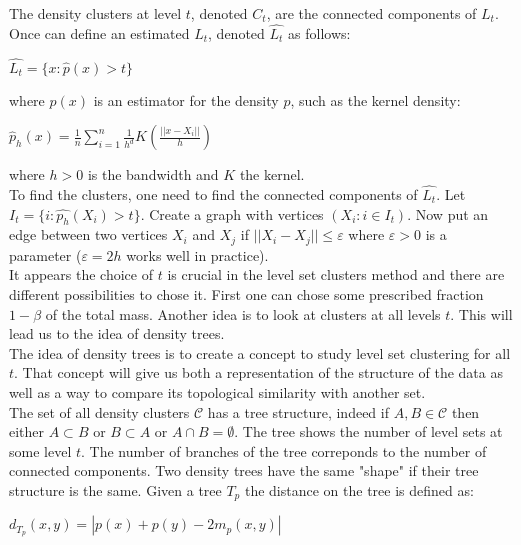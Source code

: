 \documentclass[12pt, a4paper]{article}
\begin{document}
  The density clusters at level $t$, denoted $C_t$, are the connected components of $L_t$. Once can define an estimated $L_t$, denoted $\hat{L_t}$ as follows:\\
  \begin{center}
    $\widehat{L_t} = \lbrace x : \widehat{p}(x) > t \rbrace $
  \end{center}

  where $\widehat{p}(x)$ is an estimator for the density $p$, such as the kernel density:

  \begin{center}
    $\widehat{p}_h(x) = \frac{1}{n} \sum\limits_{i=1}^n \frac{1}{h^d} K (\frac{||x-X_i||}{h})$
  \end{center}

  where $h > 0$ is the bandwidth and $K$ the kernel.\\

  To find the clusters, one need to find the connected components  of $\widehat{L_t}$. Let $I_t = \lbrace i : \widehat{p_h}(X_i) > t \rbrace$. Create a graph with vertices $(X_i : i \in I_t)$. Now put an edge between two vertices $X_i$ and $X_j$ if $||X_i - X_j|| \le \varepsilon$ where $\varepsilon > 0$ is a parameter ($\varepsilon = 2h$ works well in practice).\\

  It appears the choice of $t$ is crucial in the level set clusters method and there are different possibilities to chose it. First one can chose some prescribed fraction $1-\beta$ of the total mass. Another idea is to look at clusters at all levels $t$. This will lead us to the idea of density trees.\\

  The idea of density trees is to create a concept to study level set clustering for all $t$. That concept will give us both a representation of the structure of the data as well as a way to compare its topological similarity with another set.\\

  The set of all density clusters $\mathcal{C}$ has a tree structure, indeed if $A,B \in \mathcal{C}$ then either $A \subset B$ or $B \subset A$ or $A \cap B = \emptyset$. The tree shows the number of level sets at some level $t$. The number of branches of the tree correponds to the number of connected components. Two density trees have the same "shape" if their tree structure is the same. Given a tree $T_p$ the distance on the tree is defined as: 

  \begin{center}
    $d_{T_p}(x,y) = |p(x) + p(y) - 2m_p(x,y)|$
  \end{center}
\end{document}

